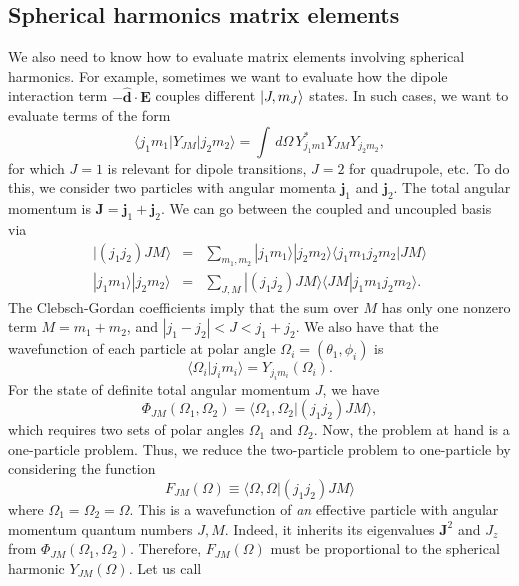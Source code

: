 \documentclass{article}
\theoremstyle{definition}
\begin{document}
\subsection{Spherical harmonics matrix elements}

We also need to know how to evaluate matrix elements involving spherical harmonics. For example, sometimes we want to evaluate how the dipole interaction term $-\hat{\bm{d}} \cdot \bm{E}$ couples different $\ket{J, m_J}$ states. In such cases, we want to evaluate terms of the form
\begin{equation}\label{eq:SH-element}
\langle j_1 m_{1} | Y_{JM} | j_2 m_{2} \rangle = \int \,d\Omega \, Y^*_{j_1 m{1}} Y_{JM} Y_{j_2 m_{2}},
\end{equation}
for which $J=1$ is relevant for dipole transitions, $J=2$ for quadrupole, etc. To do this, we consider two particles with angular momenta $\bm{j}_1$ and $\bm{j}_2$. The total angular momentum is $\bm{J} = \bm{j}_1 + \bm{j}_2$. We can go between the coupled and uncoupled basis via 
\begin{eqnarray}
| (j_1j_2) JM\rangle &=& \sum_{m_1,m_2} |j_1m_1\rangle | j_2m_2\rangle \langle j_1m_1j_2m_2 | JM\rangle\\
|j_1m_1\rangle | j_2m_2\rangle &=& \sum_{J,M} |(j_1j_2)JM\rangle \langle JM| j_1m_1j_2m_2\rangle.
\end{eqnarray}
The Clebsch-Gordan coefficients imply that the sum over $M$ has only one nonzero term $M=m_1+m_2$, and $|j_1-j_2| < J < j_1+j_2$. We also have that the wavefunction of each particle at polar angle $\Omega_i = (\theta_1,\phi_i)$ is 
\begin{equation}
\langle \Omega_i | j_i m_i \rangle = Y_{j_im_i}(\Omega_i).
\end{equation}
For the state of definite total angular momentum $J$, we have
\begin{equation}
\Phi_{JM}(\Omega_1,\Omega_2) = \langle \Omega_1 ,\Omega_2| (j_1j_2)JM\rangle,
\end{equation}
which requires two sets of polar angles $\Omega_1$ and $\Omega_2$. Now, the problem at hand is a one-particle problem. Thus, we reduce the two-particle problem to one-particle by considering the function 
\begin{equation}
F_{JM}(\Omega) \equiv \langle \Omega,\Omega| (j_1j_2)JM\rangle
\end{equation}
where $\Omega_1 = \Omega_2 = \Omega$. This is a wavefunction of \textit{an} effective particle with angular momentum quantum numbers $J,M$. Indeed, it inherits its eigenvalues $\bm{J}^2$ and $J_z$ from $\Phi_{JM}(\Omega_1,\Omega_2)$. Therefore, $F_{JM}(\Omega)$ must be proportional to the spherical harmonic $Y_{JM}(\Omega)$. Let us call
\end{document}
